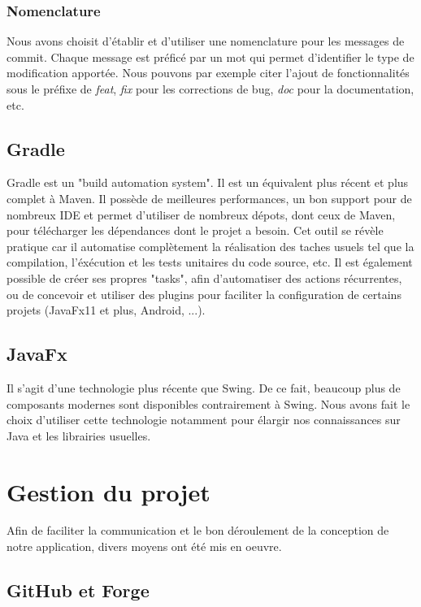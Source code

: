 			\subsubsection{Nomenclature}

				Nous avons choisit d'établir et d'utiliser une nomenclature pour les messages de commit. Chaque message est préficé par un mot qui permet d'identifier le type de modification apportée. Nous pouvons par exemple citer l'ajout de fonctionnalités sous le préfixe de \textit{feat}, \textit{fix} pour les corrections de bug, \textit{doc} pour la documentation, etc.

		\subsection{Gradle}

			Gradle est un "build automation system". Il est un équivalent plus récent et plus complet à Maven. Il possède de meilleures performances, un bon support pour de nombreux IDE et permet d'utiliser de nombreux dépots, dont ceux de Maven, pour télécharger les dépendances dont le projet a besoin. Cet outil se révèle pratique car il automatise complètement la réalisation des taches usuels tel que la compilation, l'éxécution et les tests unitaires du code source, etc. Il est également possible de créer ses propres "tasks", afin d'automatiser des actions récurrentes, ou de concevoir et utiliser des plugins pour faciliter la configuration de certains projets (JavaFx11 et plus, Android, ...).

		\subsection{JavaFx}

			Il s'agit d'une technologie plus récente que Swing. De ce fait, beaucoup plus de composants modernes sont disponibles contrairement à Swing. Nous avons fait le choix d'utiliser cette technologie notamment pour élargir nos connaissances sur Java et les librairies usuelles.

	\section{Gestion du projet}

		Afin de faciliter la communication et le bon déroulement de la conception de notre application, divers moyens ont été mis en oeuvre.

		\subsection{GitHub et Forge}

